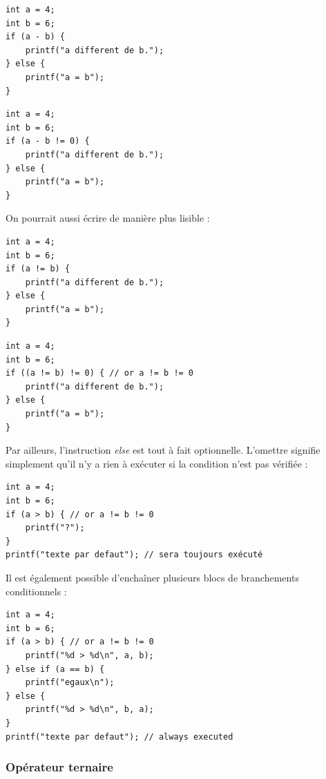 \documentclass[../../../main.tex]{subfiles}
\begin{document}
\begin{minipage}{0.5\textwidth}
\begin{verbatim}
int a = 4;
int b = 6;
if (a - b) {
	printf("a different de b.");
} else {
	printf("a = b");
}
\end{verbatim}
\end{minipage}
\begin{minipage}{0.5\textwidth}
\begin{verbatim}
int a = 4;
int b = 6;
if (a - b != 0) {
	printf("a different de b.");
} else {
	printf("a = b");
}
\end{verbatim}
\end{minipage}
 
On pourrait aussi écrire de manière plus lisible : 
 
\begin{minipage}{0.5\textwidth}
\begin{verbatim}
int a = 4;
int b = 6;
if (a != b) {
	printf("a different de b.");
} else {
	printf("a = b");
}
\end{verbatim}
\end{minipage}
\begin{minipage}{0.5\textwidth}
\begin{verbatim}
int a = 4;
int b = 6;
if ((a != b) != 0) { // or a != b != 0
	printf("a different de b.");
} else {
	printf("a = b");
}
\end{verbatim}
\end{minipage}
 
Par ailleurs, l'instruction \textit{else} est tout à fait optionnelle. L'omettre signifie simplement qu'il n'y a rien à exécuter si la condition n'est pas vérifiée :
\begin{verbatim}
int a = 4;
int b = 6;
if (a > b) { // or a != b != 0
	printf("?");
}
printf("texte par defaut"); // sera toujours exécuté
\end{verbatim}
Il est également possible d'enchaîner plusieurs blocs de branchements conditionnels :
\begin{verbatim}
int a = 4;
int b = 6;
if (a > b) { // or a != b != 0
	printf("%d > %d\n", a, b);
} else if (a == b) {
	printf("egaux\n");
} else {
	printf("%d > %d\n", b, a);
}
printf("texte par defaut"); // always executed
\end{verbatim}
\subsubsection{Opérateur ternaire}
 
\end{document}
